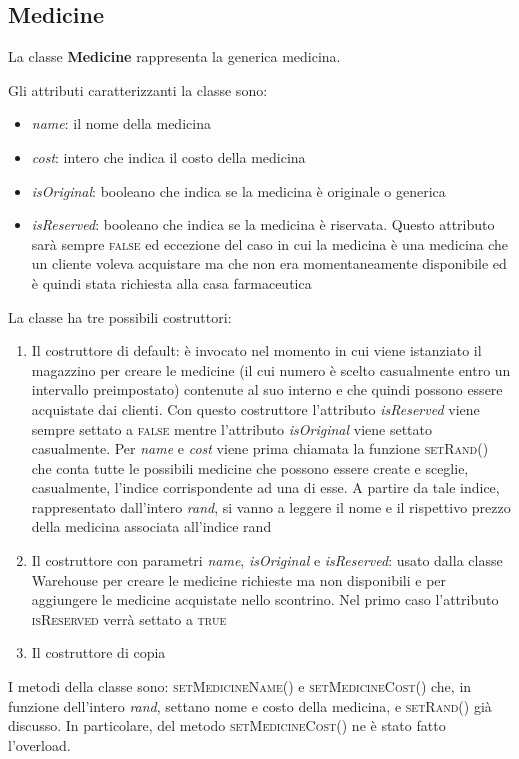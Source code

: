 \documentclass[a4paper, 10pt]{report}
\begin{document}
\subsection{Medicine}
La classe \textbf{Medicine} rappresenta la generica medicina.

Gli attributi caratterizzanti la classe sono:
\begin{itemize}
\item \textit{name}: il nome della medicina
\item \textit{cost}: intero che indica il costo della medicina
\item \textit{isOriginal}: booleano che indica se la medicina è originale o generica
\item \textit{isReserved}: booleano che indica se la medicina è riservata. Questo attributo sarà sempre \textsc{false} ed eccezione del caso in cui la medicina è una medicina che un cliente voleva acquistare ma che non era momentaneamente disponibile ed è quindi stata richiesta alla casa farmaceutica
\end{itemize}
La classe ha tre possibili costruttori:
\begin{enumerate}
\item Il costruttore di default: è invocato nel momento in cui viene istanziato il magazzino per creare le medicine (il cui numero è scelto casualmente entro un intervallo preimpostato) contenute al suo interno e che quindi possono essere acquistate dai clienti. Con questo costruttore l'attributo \textit{isReserved} viene sempre settato a \textsc{false} mentre l'attributo \textit{isOriginal} viene settato casualmente. Per \textit{name} e \textit{cost} viene prima chiamata la funzione \textsc{setRand()} che conta tutte le possibili medicine che possono essere create e sceglie, casualmente, l'indice corrispondente ad una di esse. A partire da tale indice, rappresentato dall'intero \textit{rand}, si vanno a leggere il nome e il rispettivo prezzo della medicina associata all'indice rand
\item Il costruttore con parametri \textit{name}, \textit{isOriginal} e \textit{isReserved}: usato dalla classe Warehouse per creare le medicine richieste ma non disponibili e per aggiungere le medicine acquistate nello scontrino. Nel primo caso l'attributo \textsc{isReserved} verrà settato a \textsc{true}
\item Il costruttore di copia
\end{enumerate}
I metodi della classe sono: \textsc{setMedicineName()} e \textsc{setMedicineCost()} che, in funzione dell'intero \textit{rand}, settano nome e costo della medicina, e \textsc{setRand()} già discusso. In particolare, del metodo \textsc{setMedicineCost()} ne è stato fatto l'overload.\\
\end{document}
